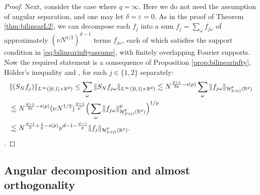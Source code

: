 \documentclass{amsart}
\numberwithin{equation}{section}
\theoremstyle{definition}
\newcommand{\R}{\mathbb{R}}
\newcommand{\Rd}{\mathbb{R}^{d}}
\newcommand {\HT}{\mathcal{H}}
\newcommand {\Hp}{\mathcal{H}^{p}_{FIO}(\R^d)}
\newcommand {\veps}{\varepsilon}
\newcommand {\w}{\omega}
\begin{document}
\begin{proof}
Next, consider the case where $q=\infty$. %
Here we do not need the assumption of angular separation, and one may let $\delta=\veps=0$. 
As in the proof of Theorem \ref{thm:bilinearL2}, 
we can decompose each $f_{j}$ into a sum $f_{j}=\sum_{\w} f_{j\w}$ of approximately $(\nu N^{1/2})^{d-1}$ terms $f_{j\w}$, each of which satisfies the support condition in \eqref{eq:bilinearinftyassume}, with finitely overlapping Fourier supports. 
Now the required statement is a consequence of Proposition \ref{prop:bilinearinfty}, H\"{o}lder's inequality and \cite[Proposition 7.1]{HaPoRoYu26}, for each $j\in\{1,2\}$ separately:%
\begin{align*}
&%
\|(S_{N}f_{j}) \|_{L^\infty([0,1]\times\Rd)}%
\leq %
\sum_{\w}\|S_{N}f_{j\w}\|_{L^\infty([0,1]\times\Rd)}%
\lesssim N^{\frac{d+1}{2p}-s(p)}%
\sum_{\w}\|f_{j\w}\|_{\HT^{p}_{FIO}(\Rd)}\\
&\lesssim N^{\frac{d+1}{2p}-s(p)}(\nu N^{1/2})^{\frac{d-1}{p'}}%
\Big(\sum_{\w}\|f_{j\w}\|_{\HT^{p}_{FIO}(\Rd)}^{p}\Big)^{1/p}\\
&\lesssim N^{\frac{d-1}{2}+\frac{1}{p}-s(p)}\nu^{d-1-\frac{d-1}{p}}\|f_{j}\|_{\Hp}.\qedhere%
\end{align*}. 
\end{proof}




\subsection{Angular decomposition and almost orthogonality}\label{subsec:orthogonal}
\end{document}
